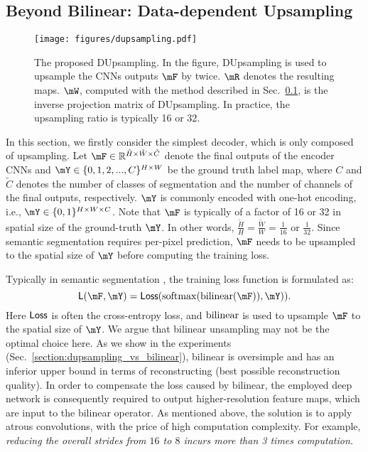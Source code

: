 \documentclass[10pt,twocolumn,letterpaper]{article}
\def\softmax{{\rm softmax}}
\def\bilinear{{\rm bilinear}}
\def\Loss{{\sf Loss}}
\def\Real{{\mathbb R}}
\newcommand{\1}{{\mathbbm{1}}}
\begin{document}
\subsection{Beyond Bilinear: Data-dependent Upsampling} \label{section:dupsampling}
\begin{figure*}[t]
  \centering
  \texttt{[image: figures/dupsampling.pdf]}
  \caption{The proposed DUpsampling. In the figure, DUpsampling is used to upsample the CNNs outputs $\mF$  by twice. $\mR$ denotes the resulting maps. $\mW$, computed with the method described in Sec.~\ref{section:dupsampling}, is the inverse projection matrix of DUpsampling. In practice, the upsampling ratio is typically 16 or 32.}
  \vspace{-0.2cm}
  \label{fig:dupsampling}
  \vspace{-0.2cm}
\end{figure*}
In this section, we firstly consider the simplest decoder, which is only composed of upsampling. Let $\mF \in \Real^{\tilde{H} \times \tilde{W} \times \tilde{C}}$ denote the final outputs of the encoder CNNs and $ \mY \in \{0, 1, 2, ..., C\}^{H \times W}$ be the ground truth label map, where $C$ and $\tilde{C}$ denotes the number of classes of segmentation and the number of channels of the final outputs, respectively.
$\mY $ is commonly encoded with one-hot encoding, i.e., $\mY \in \{0, 1\}^{H \times W \times C}$. Note that $\mF$ is typically of a factor of  16 or 32  in spatial size of the  ground-truth $\mY$.  In other words, $ \frac{\tilde{H}}{H} = \frac{\tilde{W}}{W} = \frac{1}{16}$ or $\frac{1}{32}$. Since semantic segmentation requires per-pixel prediction, $\mF$ needs to be upsampled to the spatial size of $\mY$ before computing the training loss.

Typically in semantic segmentation  \cite{chen2017rethinking, chen2018encoder, long2015fully, zhang2018context, he2019knowledge}, the training loss function is formulated as:
\begin{equation} \label{bilinear_upsampling_loss}
{\sf L}(\mF, \mY) = {\Loss}(\softmax(\bilinear(\mF)), \mY)).
\end{equation}
Here $\Loss$ is often the cross-entropy loss,  and $\bilinear$
is used to upsample $\mF$ to the spatial size of $\mY$.
We argue that bilinear unsampling may not be the optimal choice here.
As we  show in the experiments (Sec.~\ref{section:dupsampling_vs_bilinear}), bilinear is oversimple and has an inferior  upper bound in terms of  reconstructing (best possible reconstruction quality). In order to
compensate
the loss caused by bilinear, the employed deep network is consequently required to
output  higher-resolution feature maps, which are input to the bilinear operator.
As mentioned above, the solution is to apply atrous convolutions, with the price of high computation complexity.
For example, {\em  reducing the overall strides from $16$ to $8$ incurs more than 3 times computation.}
\end{document}

